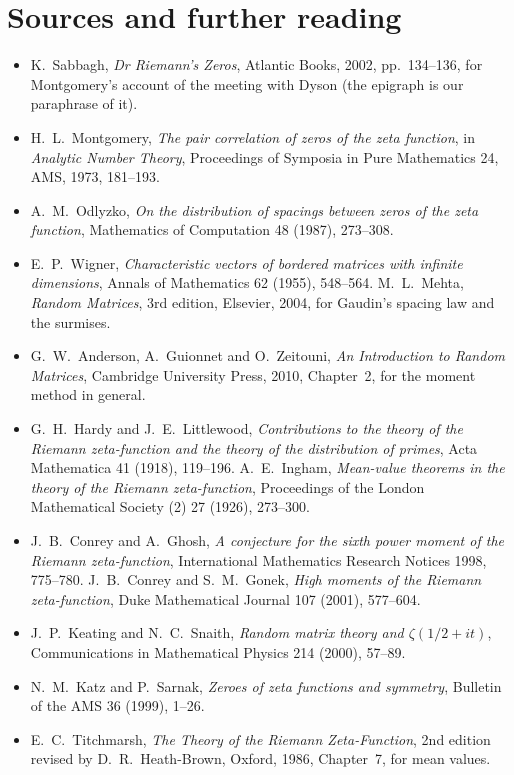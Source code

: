 \section*{Sources and further reading}

\begin{itemize}
\item K.~Sabbagh, \emph{Dr Riemann's Zeros}, Atlantic Books, 2002, pp.~134--136, for Montgomery's account of the meeting with Dyson (the epigraph is
our paraphrase of it).
\item H.~L.~Montgomery, \emph{The pair correlation of zeros of the zeta function}, in \emph{Analytic Number Theory}, Proceedings of Symposia in Pure
Mathematics 24, AMS, 1973, 181--193.
\item A.~M.~Odlyzko, \emph{On the distribution of spacings between zeros of the zeta function}, Mathematics of Computation 48 (1987), 273--308.
\item E.~P.~Wigner, \emph{Characteristic vectors of bordered matrices with infinite dimensions}, Annals of Mathematics 62 (1955), 548--564.
M.~L.~Mehta, \emph{Random Matrices}, 3rd edition, Elsevier, 2004, for Gaudin's spacing law and the surmises.
\item G.~W.~Anderson, A.~Guionnet and O.~Zeitouni, \emph{An Introduction to Random Matrices}, Cambridge University Press, 2010, Chapter~2, for the
moment method in general.
\item G.~H.~Hardy and J.~E.~Littlewood, \emph{Contributions to the theory of the Riemann zeta-function and the theory of the distribution of primes},
Acta Mathematica 41 (1918), 119--196. A.~E.~Ingham, \emph{Mean-value theorems in the theory of the Riemann zeta-function}, Proceedings of the London
Mathematical Society (2) 27 (1926), 273--300.
\item J.~B.~Conrey and A.~Ghosh, \emph{A conjecture for the sixth power moment of the Riemann zeta-function}, International Mathematics Research
Notices 1998, 775--780. J.~B.~Conrey and S.~M.~Gonek, \emph{High moments of the Riemann zeta-function}, Duke Mathematical Journal 107 (2001), 577--604.
\item J.~P.~Keating and N.~C.~Snaith, \emph{Random matrix theory and $\zeta(1/2+it)$}, Communications in Mathematical Physics 214 (2000), 57--89.
\item N.~M.~Katz and P.~Sarnak, \emph{Zeroes of zeta functions and symmetry}, Bulletin of the AMS 36 (1999), 1--26.
\item E.~C.~Titchmarsh, \emph{The Theory of the Riemann Zeta-Function}, 2nd edition revised by D.~R.~Heath-Brown, Oxford, 1986, Chapter~7, for mean values.
\end{itemize}
